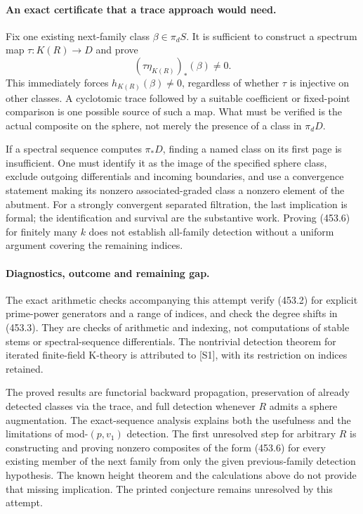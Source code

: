 \documentclass[11pt]{article}
\begin{document}
\paragraph{An exact certificate that a trace approach would need.}
Fix one existing next-family class $\beta\in\pi_dS$.
It is sufficient to construct a spectrum map $\tau:K(R)\to D$ and
prove
\[
 (\tau\eta_{K(R)})_*(\beta)\ne0.
 \tag{453.6}
\]
This immediately forces $h_{K(R)}(\beta)\ne0$, regardless of whether
$\tau$ is injective on other classes. A cyclotomic trace followed by
a suitable coefficient or fixed-point comparison is one possible
source of such a map. What must be verified is the actual composite
on the sphere, not merely the presence of a class in $\pi_dD$.

If a spectral sequence computes $\pi_*D$, finding a named class on
its first page is insufficient. One must identify it as the image of
the specified sphere class, exclude outgoing differentials and incoming
boundaries, and use a convergence statement making its nonzero
associated-graded class a nonzero element of the abutment. For a
strongly convergent separated filtration, the last implication is
formal; the identification and survival are the substantive work.
Proving (453.6) for finitely many $k$ does not establish all-family
detection without a uniform argument covering the remaining indices.

\paragraph{Diagnostics, outcome and remaining gap.}
The exact arithmetic checks accompanying this attempt verify (453.2)
for explicit prime-power generators and a range of indices, and check
the degree shifts in (453.3). They are checks of arithmetic and indexing,
not computations of stable stems or spectral-sequence differentials.
The nontrivial detection theorem for iterated finite-field K-theory is
attributed to [S1], with its restriction on indices retained.

The proved results are functorial backward propagation, preservation
of already detected classes via the trace, and full detection whenever
$R$ admits a sphere augmentation. The exact-sequence analysis explains
both the usefulness and the limitations of mod-$(p,v_1)$ detection.
The first unresolved step for arbitrary $R$ is constructing and proving
nonzero composites of the form (453.6) for every existing member of the
next family from only the given previous-family detection hypothesis.
The known height theorem and the calculations above do not provide
that missing implication. The printed conjecture remains unresolved
by this attempt.
\end{document}

